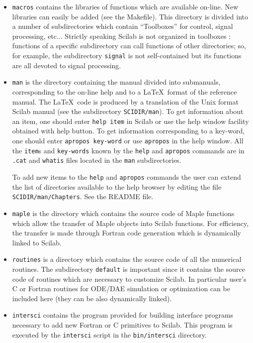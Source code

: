 \begin{itemize}
\item{{\tt macros} contains the libraries of functions
which are available on-line. New libraries can easily be added 
(see the Makefile). This directory is divided into a number of subdirectories
which contain ``Toolboxes'' for control, signal processing, etc... Strictly
speaking Scilab is not organized in toolboxes : functions of a specific
subdirectory can call functions of other directories; so, for example, the 
subdirectory {\tt signal} is not self-contained but its functions are all devoted
to signal processing.}

\item{{\tt man} is the directory containing the manual divided 
into submanuals, corresponding to the on-line help and to 
a \LaTeX\  format of the reference manual. 
The \LaTeX\  code is produced by a 
translation of the Unix format Scilab manual (see the subdirectory
{\tt SCIDIR/man}).}
To get information about an item, one should enter 
{\tt help item} 
in Scilab or use the help window facility obtained with help button.
To get information corresponding to a key-word, one should  enter 
{\tt apropos key-word} or use 
{\tt apropos} in the help window. 
All the {\tt item}s and {\tt key-words} known by the {\tt help} and 
{\tt apropos} commands are in {\tt .cat} and {\tt whatis} files 
located in the {\tt man} subdirectories.

To add new items to the {\verb!help!} and {\tt apropos} commands 
the user can extend the list of directories available to the help 
browser by editing the file {\tt SCIDIR/man/Chapters}. See the README file.

\item{{\tt maple} is the directory which contains the source code of Maple
functions which allow the transfer of Maple objects
into Scilab functions. For efficiency, the transfer
is made through Fortran code generation which is dynamically linked
to Scilab.}

\item{{\tt routines} is a directory which contains the source code of all
the numerical routines. The subdirectory {\tt default} is important
since it contains the
source code of routines which are necessary to customize Scilab.}
In particular user's C or Fortran routines for ODE/DAE simulation 
or optimization can be included here (they can be also dynamically
linked).

\item{{\tt intersci} contains the program provided for building
interface programs necessary to add new Fortran or C 
primitives to Scilab. This program is executed by the {\tt intersci}
script in the {\tt bin/intersci} directory.}


\end{itemize}
